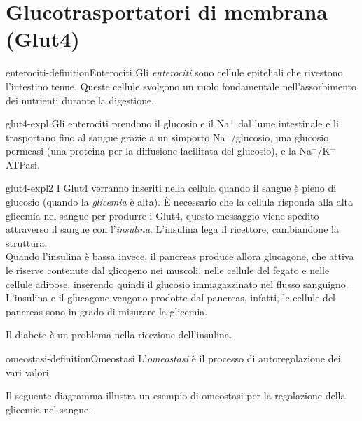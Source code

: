 \documentclass[preview]{standalone}
\begin{document}
\genpage

\section{Glucotrasportatori di membrana (Glut4)}

\begin{snippetdefinition}{enterociti-definition}{Enterociti}
    Gli \textit{enterociti} sono cellule epiteliali che rivestono l'intestino tenue.
    Queste cellule svolgono un ruolo fondamentale nell'assorbimento dei nutrienti durante la digestione.
\end{snippetdefinition}

\begin{snippet}{glut4-expl}
    Gli enterociti prendono il glucosio e il Na\({}^+\) dal lume intestinale
    e li trasportano fino al sangue grazie a un simporto Na\({}^+\)/glucosio, una glucosio permeasi
    (una proteina per la diffusione facilitata del glucosio), e la Na\({}^+\)/K\({}^+\)ATPasi. 
\end{snippet}



\begin{snippet}{glut4-expl2}
    I Glut4 verranno inseriti nella cellula quando il sangue è pieno di glucosio (quando la \textit{glicemia} è alta).
È necessario che la cellula risponda alla alta glicemia nel sangue per produrre i Glut4,
questo messaggio viene spedito attraverso il sangue con l'\textit{insulina}.
L'insulina lega il ricettore, cambiandone la struttura. \\
Quando l'insulina è bassa invece, il pancreas produce allora glucagone, che attiva le riserve contenute
dal glicogeno nei muscoli, nelle cellule del fegato e nelle cellule adipose, inserendo quindi il glucosio
immagazzinato nel flusso sanguigno.
L'insulina e il glucagone vengono prodotte dal pancreas, infatti, le cellule del pancreas sono in grado di misurare la glicemia.
\end{snippet}


\begin{plainhtml}
    Il diabete è un problema nella ricezione dell'insulina.
\end{plainhtml}

\begin{snippetdefinition}{omeostasi-definition}{Omeostasi}
    L'\textit{omeostasi} è il processo di autoregolazione dei vari valori.
\end{snippetdefinition}

\begin{plainhtml}
    Il seguente diagramma illustra un esempio di omeostasi per la regolazione della glicemia nel sangue.
\end{plainhtml}

\end{document}

